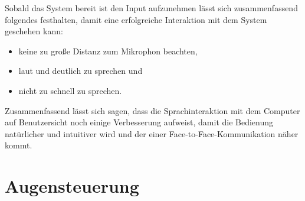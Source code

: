 \newline \newline
Sobald das System bereit ist den Input aufzunehmen lässt sich zusammenfassend folgendes festhalten, damit eine erfolgreiche Interaktion mit dem System geschehen kann:
\begin{itemize}
      \item keine zu große Distanz zum Mikrophon beachten,
      \item laut und deutlich zu sprechen und
			\item nicht zu schnell zu sprechen.
\end{itemize}
\vspace{\baselineskip}
Zusammenfassend lässt sich sagen, dass die Sprachinteraktion mit dem Computer auf Benutzersicht noch einige Verbesserung aufweist, damit die Bedienung natürlicher und intuitiver wird und der einer Face-to-Face-Kommunikation näher kommt.

\section{Augensteuerung}
\label{cha:Augensteuerung}

